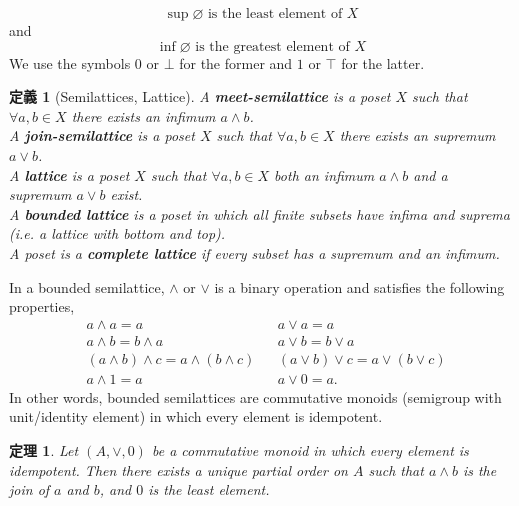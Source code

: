 \documentclass[a4j,12pt]{jarticle}
\numberwithin{equation}{section}
\newcommand{\itbf}[1]{\textit{\textbf{#1}}}
\newtheorem{dfn}{定義}[section]
\newtheorem{thm}{定理}[section]
\begin{document}
\begin{equation}
  \sup\varnothing \text{ is the least element of } X
\end{equation}
and
\begin{equation}
  \inf\varnothing \text{ is the greatest element of } X
\end{equation}
We use the symbols $0$ or $\bot$ for the former and $1$ or $\top$ for the latter.\\
\begin{dfn}[Semilattices, Lattice]
  A \itbf{meet-semilattice} is a poset $X$ such that $\forall a,b \in X$ there exists an infimum $a \wedge b$.\\
  A \itbf{join-semilattice} is a poset $X$ such that $\forall a,b \in X$ there exists an supremum $a \vee b$.\\
  A \itbf{lattice} is a poset $X$ such that $\forall a,b \in X$ both an infimum $a \wedge b$ and a supremum $a \vee b$ exist.\\
  A \itbf{bounded lattice} is a poset in which all finite subsets have infima and suprema (i.e. a lattice with bottom and top).\\
  A poset is a \itbf{complete lattice} if every subset has a supremum and an infimum.
\end{dfn}
In a bounded semilattice, $\wedge$ or $\vee$ is a binary operation and satisfies the following properties,
\begin{align}
  & a \wedge a = a && a \vee a = a\\
  & a \wedge b = b \wedge a &&  a \vee b = b \vee a \\
  & (a \wedge b) \wedge c = a \wedge (b \wedge c)  && (a \vee b) \vee c = a \vee (b \vee c) \\
  & a \wedge 1 = a && a \vee 0 = a.
\end{align}
In other words, bounded semilattices are commutative monoids (semigroup with unit/identity element) in which every element is idempotent.\\
\begin{thm}
  Let $(A, \vee, 0)$ be a commutative monoid in which every element is idempotent.
  Then there exists a unique partial order on $A$ such that $a \wedge b$ is the join of $a$ and $b$, and $0$ is the least element.
\end{thm}
\end{document}
